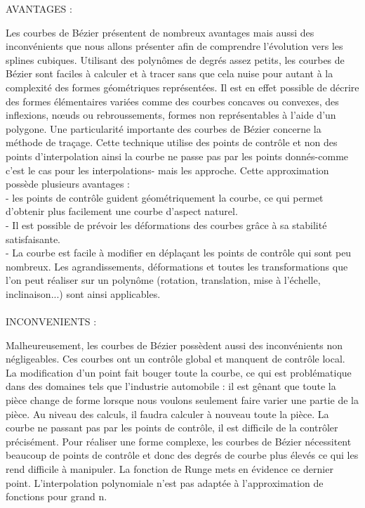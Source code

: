 \documentclass{article}
\begin{document}
\begin{flushleft}
AVANTAGES :
\end{flushleft}
\par
Les courbes de B\'{e}zier pr\'{e}sentent de nombreux avantages mais aussi des inconv\'{e}nients que nous allons pr\'{e}senter afin de comprendre l'\'{e}volution vers les splines cubiques.
Utilisant des polyn\^{o}mes de degr\'{e}s assez petits, les courbes de B\'{e}zier sont faciles \`{a} calculer et \`{a} tracer sans que cela nuise pour autant \`{a} la complexit\'{e} des formes g\'{e}om\'{e}triques repr\'{e}sent\'{e}es. Il est en effet possible de d\'{e}crire des formes \'{e}l\'{e}mentaires vari\'{e}es comme des courbes concaves ou convexes, des inflexions, n\oe{}uds ou rebroussements, formes non repr\'{e}sentables \`{a} l'aide d'un polygone.
Une particularit\'{e} importante des courbes de B\'{e}zier concerne la m\'{e}thode de tra\c{c}age. Cette technique utilise des points de contr\^{o}le et non des points d'interpolation ainsi la courbe ne passe pas par les points donn\'{e}s-comme c'est le cas pour les interpolations- mais les approche. Cette approximation poss\`{e}de plusieurs avantages :
\\
- les points de contr\^{o}le guident g\'{e}om\'{e}triquement la courbe, ce qui permet d'obtenir plus facilement une courbe d'aspect naturel.
\\
- Il est possible de pr\'{e}voir les d\'{e}formations des courbes gr\^ace \`{a} sa stabilit\'{e} satisfaisante.
\\
- La courbe est facile \`{a} modifier en d\'{e}pla\c{c}ant les points de contr\^{o}le qui sont peu nombreux. Les agrandissements, d\'{e}formations et toutes les transformations que l'on peut r\'{e}aliser sur un polyn\^{o}me (rotation, translation, mise \`{a} l'\'{e}chelle, inclinaison...) sont ainsi applicables.
\\\\
INCONVENIENTS :
\\
\par
Malheureusement, les courbes de B\'{e}zier poss\`{e}dent aussi des inconv\'{e}nients non n\'{e}gligeables.
Ces courbes ont un contr\^{o}le global et manquent de contr\^{o}le local. La modification d'un point fait bouger toute la courbe, ce qui est probl\'{e}matique dans des domaines tels que l'industrie automobile : il est g\^{e}nant que toute la pi\`{e}ce change de forme lorsque nous voulons seulement faire varier une partie de la pi\`{e}ce. Au niveau des calculs, il faudra calculer \`{a} nouveau toute la pi\`{e}ce.
La courbe ne passant pas par les points de contr\^{o}le, il est difficile de la contr\^{o}ler pr\'{e}cis\'{e}ment.
Pour r\'{e}aliser une forme complexe, les courbes de B\'{e}zier n\'{e}cessitent beaucoup de points de contr\^{o}le et donc des degr\'{e}s de courbe plus \'{e}lev\'{e}s ce qui les rend difficile \`{a} manipuler. 
La fonction de Runge mets en \'{e}vidence ce dernier point. L'interpolation polynomiale n'est pas adapt\'{e}e \`{a} l'approximation de fonctions pour grand n.
\end{document}
